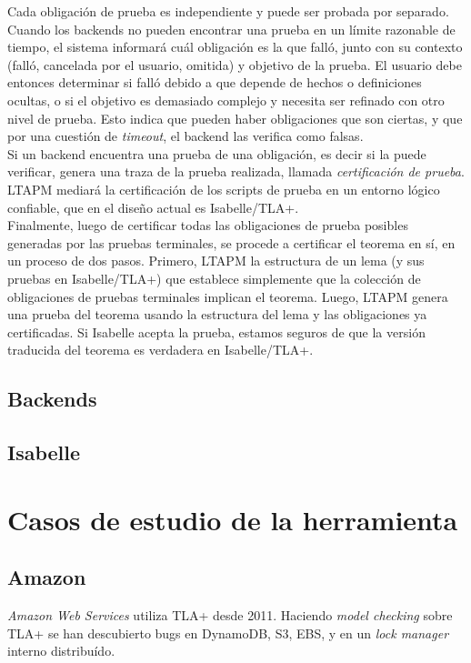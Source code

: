 \documentclass[spanish]{llncs}
\begin{document}
  Cada obligación de prueba es independiente y puede ser probada por separado. Cuando los
  backends no pueden encontrar una prueba en un límite razonable de tiempo, el sistema
  informará cuál obligación es la que falló, junto con su contexto (falló, cancelada por el usuario, omitida) y objetivo de la prueba. El usuario debe
  entonces determinar si falló debido a que depende de hechos o definiciones ocultas, o si el objetivo es
  demasiado complejo y necesita ser refinado con otro nivel de prueba. Esto indica que pueden haber obligaciones que son ciertas, y que por una cuestión de \textit{timeout},
  el backend las verifica como falsas.
  \\
  
  Si un backend encuentra una prueba de una obligación, es decir si la puede verificar,
  genera una traza de la prueba realizada, llamada \textit{certificación de prueba}. LTAPM  mediará
  la certificación de los scripts de prueba en un entorno lógico confiable, que en el diseño actual
  es Isabelle/TLA+.
  \\
  
  Finalmente, luego de certificar todas las obligaciones de prueba posibles generadas por las pruebas
  terminales, se procede a certificar el teorema en sí, en un proceso de dos pasos. Primero, LTAPM  la
  estructura de un lema (y sus pruebas en Isabelle/TLA+) que establece simplemente que la colección de
  obligaciones de pruebas terminales implican el teorema. Luego, LTAPM genera una prueba del teorema
  usando la estructura del lema y las obligaciones ya certificadas. Si Isabelle acepta la prueba, estamos
  seguros de que la versión traducida del teorema es verdadera en Isabelle/TLA+.

  \subsection{Backends}
    \subsection{Isabelle}
    
\section{Casos de estudio de la herramienta}


\subsection{Amazon}
\textit{Amazon Web Services} utiliza TLA+ desde 2011. Haciendo \textit{model checking} sobre TLA+ se han descubierto bugs
en DynamoDB, S3, EBS, y en un \textit{lock manager} interno distribuído.
\end{document}
